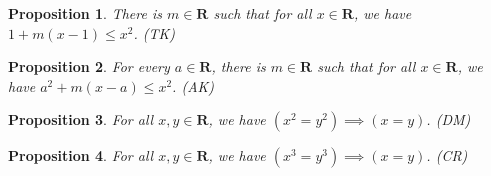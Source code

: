 \documentclass[12pt,fleqn]{article}
\newcommand{\reals}{\mathbf{R}}
\newtheorem{prop}{Proposition}
\begin{document}
     \begin{prop}
      There is $m \in \reals$ such that for all $x \in \reals$, we 
     have $1 + m(x-1) \leq x^2$. \hfill (TK)
     \end{prop}

     \begin{prop} For every $a \in \reals$, there is $m \in \reals$ such 
     that for all $x \in \reals$, we have $a^2 + m(x-a) \leq x^2$. \hfill (AK)
     \end{prop}

     \begin{prop} For all $x,y \in \reals$, we have $(x^2 = y^2) \implies (x=y)$. 
     \hfill (DM)
     \end{prop} 

    \begin{prop} For all $x,y \in \reals$, we have $(x^3 = y^3) \implies (x=y)$. 
    \hfill (CR) 
    \end{prop}
\end{document}
